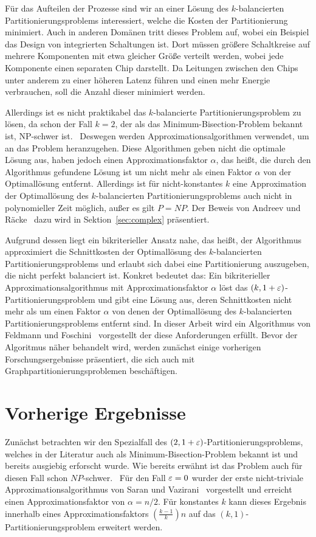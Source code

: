 Für das Aufteilen der Prozesse sind wir an einer Lösung des $k$\hyp balancierten Partitionierungsproblems interessiert, welche die Kosten der Partitionierung minimiert.
Auch in anderen Domänen tritt dieses Problem auf, wobei ein Beispiel das Design von integrierten Schaltungen ist.
Dort müssen größere Schaltkreise auf mehrere Komponenten mit etwa gleicher Größe verteilt werden, wobei jede Komponente einen separaten Chip darstellt.
Da Leitungen zwischen den Chips unter anderem zu einer höheren Latenz führen und einen mehr Energie verbrauchen, soll die Anzahl dieser minimiert werden.

Allerdings ist es nicht praktikabel das $k$\hyp balancierte Partitionierungsproblem zu lösen, da schon der Fall $k=2$, der als das Minimum-Bisection-Problem bekannt ist, NP-schwer ist.~\cite{gj79}
Deswegen werden Approximationsalgorithmen verwendet, um an das Problem heranzugehen.
Diese Algorithmen geben nicht die optimale Lösung aus, haben jedoch einen Approximationsfaktor $\alpha$, das heißt, die durch den Algorithmus gefundene Lösung ist um nicht mehr als einen Faktor $\alpha$ von der Optimallösung entfernt.
Allerdings ist für nicht-konstantes $k$ eine Approximation der Optimallösung des $k$\hyp balancierten Partitionierungsproblems auch nicht in polynomieller Zeit möglich, außer es gilt $P=NP$.
Der Beweis von Andreev und Räcke~\cite{ar06} dazu wird in Sektion~\ref{sec:complex} präsentiert.

Aufgrund dessen liegt ein bikriterieller Ansatz nahe, das heißt, der Algorithmus approximiert die Schnittkosten der Optimallösung des $k$\hyp balancierten Partitionierungsproblems und erlaubt sich dabei eine Partitionierung auszugeben, die nicht perfekt balanciert ist.
Konkret bedeutet das: Ein bikriterieller Approximationsalgorithmus mit Approximationsfaktor $\alpha$ löst das $(k, 1 + \varepsilon)$\hyp Partitionierungsproblem und gibt eine Lösung aus, deren Schnittkosten nicht mehr als um einen Faktor $\alpha$ von denen der Optimallösung des $k$\hyp balancierten Partitionierungsproblems entfernt sind.
In dieser Arbeit wird ein Algorithmus von Feldmann und Foschini~\cite{FF15} vorgestellt der diese Anforderungen erfüllt.
Bevor der Algoritmus näher behandelt wird, werden zunächst einige vorherigen Forschungsergebnisse präsentiert, die sich auch mit Graphpartitionierungsproblemen beschäftigen.

\section{Vorherige Ergebnisse}
Zunächst betrachten wir den Spezialfall des $(2, 1 + \varepsilon)$\hyp Partitionierungsproblems, welches in der Literatur auch als Minimum-Bisection-Problem bekannt ist und bereits ausgiebig erforscht wurde.
Wie bereits erwähnt ist das Problem auch für diesen Fall schon $NP$\hyp schwer.~\cite{gj79}
Für den Fall $\varepsilon = 0$ wurder der erste nicht-triviale Approximationsalgorithmus von Saran und Vazirani~\cite{SV91} vorgestellt und erreicht einen Approximationsfaktor von $\alpha = n/2$.
Für konstantes $k$ kann dieses Ergebnis innerhalb eines Approximationsfaktors $\left(\frac{k-1}{k}\right)n$ auf das $(k, 1)$\hyp Partitionierungsproblem erweitert werden.

